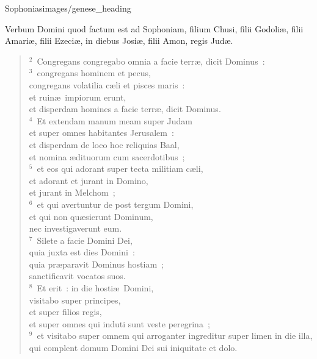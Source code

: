 {Sophonias}{images/genese_heading}


\lettrine[lines=10,image=true,loversize=0.05,lraise=-0.03]{V}{}erbum Domini quod factum est ad Sophoniam, filium Chusi, filii Godoli\ae , filii Amari\ae , filii Ezeci\ae , in diebus Josi\ae , filii Amon, regis Jud\ae .


\begin{flushleft}\begin{verse}\vspace{6pt}${}^{2}$~Congregans congregabo omnia a facie terr\ae , dicit Dominus~:\\
${}^{3}$~congregans hominem et pecus,\\ congregans volatilia c\ae li et pisces maris~:\\ et ruin\ae\ impiorum erunt,\\ et disperdam homines a facie terr\ae , dicit Dominus.\\
${}^{4}$~Et extendam manum meam super Judam\\ et super omnes habitantes Jerusalem~:\\ et disperdam de loco hoc reliquias Baal,\\ et nomina \ae dituorum cum sacerdotibus~;\\
${}^{5}$~et eos qui adorant super tecta militiam c\ae li,\\ et adorant et jurant in Domino,\\ et jurant in Melchom~;\\
${}^{6}$~et qui avertuntur de post tergum Domini,\\ et qui non qu\ae sierunt Dominum,\\ nec investigaverunt eum.\\
${}^{7}$~Silete a facie Domini Dei,\\ quia juxta est dies Domini~:\\ quia pr\ae paravit Dominus hostiam~;\\ sanctificavit vocatos suos.\\
${}^{8}$~Et erit~: in die hosti\ae\ Domini,\\ visitabo super principes,\\ et super filios regis,\\ et super omnes qui induti sunt veste peregrina~;\\
${}^{9}$~et visitabo super omnem qui arroganter ingreditur super limen in die illa,\\ qui complent domum Domini Dei sui iniquitate et dolo.\\

\end{verse}
\end{flushleft}
